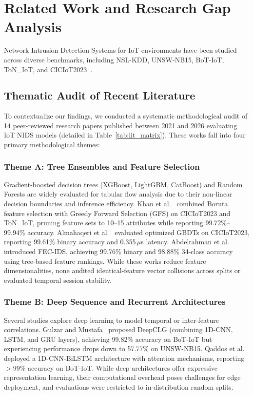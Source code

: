 \documentclass[conference,10pt,twocolumn]{IEEEtran}
\begin{document}
\section{Related Work and Research Gap Analysis}
\label{sec:related_work}

Network Intrusion Detection Systems for IoT environments have been studied across diverse benchmarks, including NSL-KDD, UNSW-NB15, BoT-IoT, ToN\_IoT, and CICIoT2023~\cite{ahmad2021network, mishra2019detailed, booij2022toniot}.

\subsection{Thematic Audit of Recent Literature}
To contextualize our findings, we conducted a systematic methodological audit of 14 peer-reviewed research papers published between 2021 and 2026 evaluating IoT NIDS models (detailed in Table~\ref{tab:lit_matrix}). These works fall into four primary methodological themes:

\subsubsection{Theme A: Tree Ensembles and Feature Selection}
Gradient-boosted decision trees (XGBoost, LightGBM, CatBoost) and Random Forests are widely evaluated for tabular flow analysis due to their non-linear decision boundaries and inference efficiency. Khan et al.~\cite{khan2026resource} combined Boruta feature selection with Greedy Forward Selection (GFS) on CICIoT2023 and ToN\_IoT, pruning feature sets to 10--15 attributes while reporting 99.72\%--99.94\% accuracy. Almahaqeri et al.~\cite{almahaqeri2026optimized} evaluated optimized GBDTs on CICIoT2023, reporting 99.61\% binary accuracy and 0.355\,$\mu$s latency. Abdelrahman et al.~\cite{abdelrahman2026feature} introduced FEC-IDS, achieving 99.76\% binary and 98.88\% 34-class accuracy using tree-based feature rankings. While these works reduce feature dimensionalities, none audited identical-feature vector collisions across splits or evaluated temporal session stability.

\subsubsection{Theme B: Deep Sequence and Recurrent Architectures}
Several studies explore deep learning to model temporal or inter-feature correlations. Gulzar and Mustafa~\cite{gulzar2025enhancing} proposed DeepCLG (combining 1D-CNN, LSTM, and GRU layers), achieving 99.82\% accuracy on BoT-IoT but experiencing performance drops down to 57.77\% on UNSW-NB15. Qaddos et al.~\cite{qaddos2024novel} deployed a 1D-CNN-BiLSTM architecture with attention mechanisms, reporting $>$99\% accuracy on BoT-IoT. While deep architectures offer expressive representation learning, their computational overhead poses challenges for edge deployment, and evaluations were restricted to in-distribution random splits.
\end{document}
